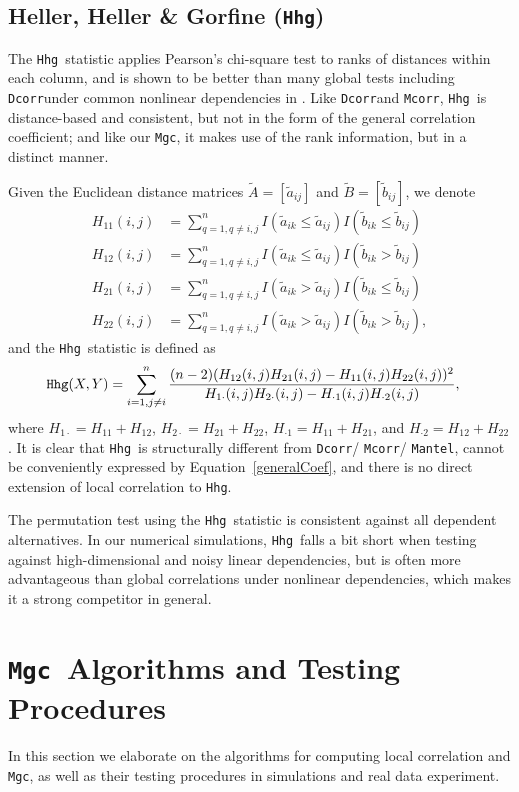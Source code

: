 \documentclass[11pt]{article}
\providecommand{\sct}[1]{{\sc \texttt{#1}}}
\newcommand{\Mgc}{\sct{Mgc}}
\newcommand{\Hhg}{\sct{Hhg}}
\newcommand{\Dcorr}{\sct{Dcorr}}
\newcommand{\Mcorr}{\sct{Mcorr}}
\newcommand{\Mantel}{\sct{Mantel}}
\begin{document}
\subsection{Heller, Heller \& Gorfine (\Hhg)}
\label{appen:hhg}
The \Hhg~statistic applies Pearson's chi-square test to ranks of distances within each column, and is shown to be better than many global tests including \Dcorr under common nonlinear dependencies in \cite{GorfineHellerHeller2012, HellerGorfine2013}. Like \Dcorr and \Mcorr, \Hhg~is distance-based and consistent, but not in the form of the general correlation coefficient; and like our \Mgc, it makes use of the rank information, but in a distinct manner.

Given the Euclidean distance matrices $\tilde{A}=[\tilde{a}_{ij}]$ and $\tilde{B}=[\tilde{b}_{ij}]$, we denote
\begin{align*}
H_{11}(i,j) &= \sum_{q=1,q\neq i,j}^{n}I(\tilde{a}_{ik} \leq \tilde{a}_{ij})I(\tilde{b}_{ik} \leq \tilde{b}_{ij}) \\
H_{12}(i,j) &= \sum_{q=1,q\neq i,j}^{n}I(\tilde{a}_{ik} \leq \tilde{a}_{ij})I(\tilde{b}_{ik} > \tilde{b}_{ij}) \\
H_{21}(i,j) &= \sum_{q=1,q\neq i,j}^{n}I(\tilde{a}_{ik} > \tilde{a}_{ij})I(\tilde{b}_{ik} \leq \tilde{b}_{ij}) \\
H_{22}(i,j) &= \sum_{q=1,q\neq i,j}^{n}I(\tilde{a}_{ik} > \tilde{a}_{ij})I(\tilde{b}_{ik} > \tilde{b}_{ij}),
\end{align*}
and the \Hhg~statistic is defined as
\begin{align*}
\Hhg(X,Y) &= \sum_{i=1,j\neq i}^{n} \frac{(n-2)(H_{12}(i,j)H_{21}(i,j)-H_{11}(i,j)H_{22}(i,j))^2}{H_{1 \cdot}(i,j)H_{2 \cdot}(i,j)-H_{\cdot 1}(i,j)H_{\cdot 2}(i,j)},
\end{align*}
where $H_{1 \cdot}=H_{11}+H_{12}$, $H_{2 \cdot}=H_{21}+H_{22}$, $H_{\cdot 1}=H_{11}+H_{21}$, and $H_{\cdot 2}=H_{12}+H_{22}$. It is clear that \Hhg~is structurally different from \Dcorr / \Mcorr / \Mantel, cannot be conveniently expressed by Equation~\ref{generalCoef}, and there is no direct extension of local correlation to \Hhg.

The permutation test using the \Hhg~statistic is consistent against all dependent alternatives. In our numerical simulations, \Hhg~falls a bit short when testing against high-dimensional and noisy linear dependencies, but is often more advantageous than global correlations under nonlinear dependencies, which makes it a strong competitor in general. 

\section{\Mgc~Algorithms and Testing Procedures}
\label{appen:tests}
In this section we elaborate on the algorithms for computing local correlation and \Mgc, as well as their testing procedures in simulations and real data experiment. 
\end{document}

